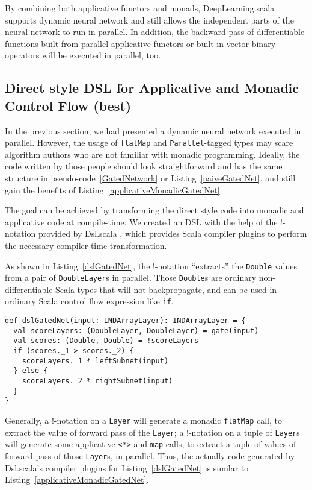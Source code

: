By combining both applicative functors and monads, DeepLearning.scala supports dynamic neural network and still allows the independent parts of the neural network to run in parallel. In addition, the backward pass of differentiable functions built from parallel applicative functors or built-in vector binary operators will be executed in parallel, too.

\subsection{Direct style DSL for Applicative and Monadic Control Flow (best)}

In the previous section, we had presented a dynamic neural network executed in parallel. However, the usage of \lstinline{flatMap} and \lstinline{Parallel}-tagged types may scare algorithm authors who are not familiar with monadic programming. Ideally, the code written by those people should look straightforward and has the same structure in pseudo-code~\ref{GatedNetwork} or Listing~\ref{naiveGatedNet}, and still gain the benefits of Listing~\ref{applicativeMonadicGatedNet}.

The goal can be achieved by transforming the direct style code into monadic and applicative code at compile-time. We created an DSL with the help of the !-notation provided by Dsl.scala \cite{yang2017dsl}, which provides Scala compiler plugins to perform the necessary compiler-time transformation.

As shown in Listing~\ref{dslGatedNet}, the !-notation ``extracts'' the \lstinline{Double} values from a pair of \lstinline{DoubleLayer}s in parallel. Those \lstinline{Double}s are ordinary non-differentiable Scala types that will not backpropagate, and can be used in ordinary Scala control flow expression like \lstinline{if}.

\begin{lstlisting}[float={h t b p},caption={Dsl.scala powered direct style gated network}, label={dslGatedNet}]
def dslGatedNet(input: INDArrayLayer): INDArrayLayer = {
  val scoreLayers: (DoubleLayer, DoubleLayer) = gate(input)
  val scores: (Double, Double) = !scoreLayers
  if (scores._1 > scores._2) {
    scoreLayers._1 * leftSubnet(input)
  } else {
    scoreLayers._2 * rightSubnet(input)
  }
}
\end{lstlisting}

Generally, a !-notation on a \lstinline{Layer} will generate a monadic \lstinline{flatMap} call, to extract the value of forward pass of the \lstinline{Layer}; a !-notation on a tuple of \lstinline{Layer}s will generate some applicative \lstinline{<*>} and \lstinline{map} calls, to extract a tuple of values of forward pass of those \lstinline{Layer}s, in parallel. Thus, the actually code generated by Dsl.scala's compiler plugins for Listing~\ref{dslGatedNet} is similar to Listing~\ref{applicativeMonadicGatedNet}.

